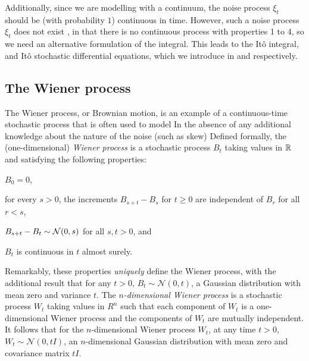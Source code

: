 Additionally, since we are modelling with a continuum, the noise process \(\xi_t\) should be (with probability \(1\)) continuous in time.
However, such a noise process \(\xi_t\) does not exist \citep{Oksendal_2003_StochasticDifferentialEquations}, in that there is no continuous process with properties 1 to 4, so we need an alternative formulation of the integral.
This leads to the It\^o integral, and It\^o stochastic differential equations, which we introduce in  and  respectively.



\subsection{The Wiener process}

The Wiener process, or Brownian motion, is an example of a continuous-time stochastic process that is often used to model 
In the absence of any additional knowledge about the nature of the noise (such as skew)
Defined formally, the (one-dimensional) \emph{Wiener process} is a stochastic process \(B_t\) taking values in \(\mathbb{R}\) and satisfying the following properties:
\begin{romanate}
	\item \(B_0 = 0\),
	\item for every \(s > 0\), the increments \(B_{s + t} - B_{s}\) for \(t \geq 0\) are independent of \(B_r\) for all \(r < s\),
	\item \(B_{s + t} - B_t \sim\mathcal{N}\!\left(0, s\right)\) for all \(s,t > 0\), and
	\item \(B_t\) is continuous in \(t\) almost surely.
\end{romanate}
Remarkably, these properties \emph{uniquely} define the Wiener process, with the additional result that for any \(t > 0\), \(B_t \sim \mathcal{N}\left(0, t\right)\), a Gaussian distribution with mean zero and variance \(t\).
The \emph{\(n\)-dimensional Wiener process} is a stochastic process \(W_t\) taking values in \(R^n\) such that each component of \(W_t\) is a one-dimensional Wiener process and the components of \(W_t\) are mutually independent.
It follows that for the \(n\)-dimensional Wiener process \(W_t\), at any time \(t > 0\), \(W_t \sim \mathcal{N}\left(0, tI\right)\), an \(n\)-dimensional Gaussian distribution with mean zero and covariance matrix \(tI\).


